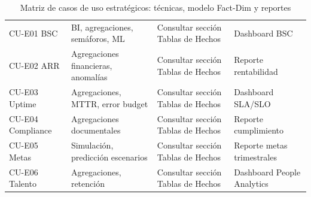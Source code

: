 ﻿\documentclass[11pt, letterpaper]{article}
\begin{document}
\begin{table}[H]

\small

\centering

\begin{tabularx}{\linewidth}{>{\raggedright\arraybackslash}p{2cm} >{\raggedright\arraybackslash}p{3.5cm} >{\raggedright\arraybackslash}p{3.5cm} >{\raggedright\arraybackslash}X}

\toprule

\multicolumn{1}{>{\raggedright\arraybackslash}p{2cm}}{\textbf{CU}} &

\multicolumn{1}{>{\raggedright\arraybackslash}p{3.5cm}}{\textbf{Técnicas}} &

\multicolumn{1}{>{\raggedright\arraybackslash}p{3.5cm}}{\textbf{Modelo Fact-Dim}} &

\multicolumn{1}{>{\raggedright\arraybackslash}X}{\textbf{Reportes}} \\

\midrule

CU-E01 BSC & BI, agregaciones, semáforos, ML & Consultar sección Tablas de Hechos & Dashboard BSC \\

\midrule

CU-E02 ARR & Agregaciones financieras, anomalías & Consultar sección Tablas de Hechos & Reporte rentabilidad \\

\midrule

CU-E03 Uptime & Agregaciones, MTTR, error budget & Consultar sección Tablas de Hechos & Dashboard SLA/SLO \\

\midrule

CU-E04 Compliance & Agregaciones documentales & Consultar sección Tablas de Hechos & Reporte cumplimiento \\

\midrule

CU-E05 Metas & Simulación, predicción escenarios & Consultar sección Tablas de Hechos & Reporte metas trimestrales \\

\midrule

CU-E06 Talento & Agregaciones, retención & Consultar sección Tablas de Hechos & Dashboard People Analytics \\

\bottomrule

\end{tabularx}

\caption{Matriz de casos de uso estratégicos: técnicas, modelo Fact-Dim y reportes}

\end{table}
\end{document}
